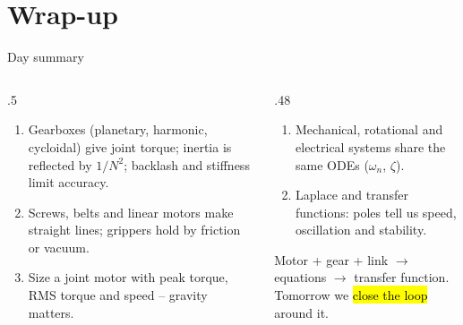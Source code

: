 \documentclass[aspectratio=169,10pt]{beamer}
\begin{document}
\section*{Wrap-up}
\begin{frame}{Day summary}
\begin{columns}[T]
\begin{column}{.5\textwidth}
\small
\begin{enumerate}\setlength\itemsep{3pt}
\item[1.5] Gearboxes (planetary, harmonic, cycloidal) give joint torque; inertia is reflected by $1/N^2$; backlash and stiffness limit accuracy.
\item[1.6] Screws, belts and linear motors make straight lines; grippers hold by friction or vacuum.
\item[1.7] Size a joint motor with peak torque, RMS torque and speed -- gravity matters.
\end{enumerate}
\end{column}
\begin{column}{.48\textwidth}
\small
\begin{enumerate}\setlength\itemsep{3pt}
\item[2.1] Mechanical, rotational and electrical systems share the same ODEs ($\omega_n$, $\zeta$).
\item[2.2] Laplace and transfer functions: poles tell us speed, oscillation and stability.
\end{enumerate}
\begin{keybox}
Motor + gear + link $\rightarrow$ equations $\rightarrow$ transfer function. Tomorrow we \hl{close the loop} around it.
\end{keybox}
\end{column}
\end{columns}
\end{frame}
\end{document}
